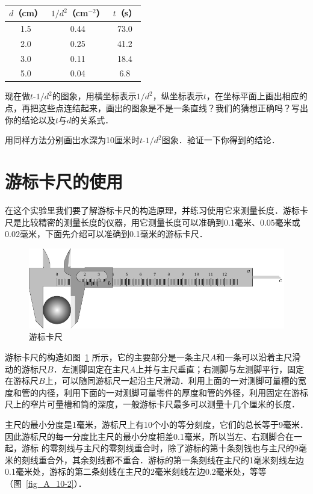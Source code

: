 \begin{table}[htbp]
	\centering
    \begin{tabular}{ccc}
        \toprule
		$d$（cm）  &  $1/d^2$（cm$^{-2}$） &  $t$（s）\\
		\midrule
		1.5 &  0.44 & 73.0 \\
		2.0 &  0.25 & 41.2 \\
		3.0 &  0.11 & 18.4 \\
		5.0 &  0.04 & 6.8\\
     	\bottomrule
    \end{tabular}
    \caption{}\label{tab_A_10-2}
\end{table}

现在做$t$-$1/d^2$的图象，用横坐标表示$1/d^2$，纵坐标表示$t$，在坐标平面上画出相应的点，再把这些点连结起来，画出的图象是不是一条直线？我们的猜想正确吗？写出你的结论以及$t$与$d$的关系式．

用同样方法分别画出水深为10厘米时$t$-$1/d^2$图象．验证一下你得到的结论．


\section{游标卡尺的使用}
在这个实验里我们要了解游标卡尺的构造原理，并练习使用它来测量长度．游标卡尺是比较精密的测量长度的仪器，用它测量长度可以准确到0.1毫米、0.05毫米或0.02毫米，下面先介绍可以准确到0.1毫米的游标卡尺．
\begin{figure}[htbp]
    \centering
    \includegraphics{fig/A/10-1.pdf}
    \caption{游标卡尺}\label{fig_A_10-1}
\end{figure}

游标卡尺的构造如图~\ref{fig_A_10-1} 所示，它的主要部分是一条主尺$A$和一条可以沿着主尺滑动的游标尺$B$．左测脚固定在主尺$A$上并与主尺垂直；右测脚与左测脚平行，固定在游标尺$B$上，可以随同游标尺一起沿主尺滑动．利用上面的一对测脚可量槽的宽度和管的内径，利用下面的一对测脚可量零件的厚度和管的外径，利用固定在游标尺上的窄片可量槽和筒的深度，一般游标卡尺最多可以测量十几个厘米的长度．

主尺的最小分度是1毫米，游标尺上有10个小的等分刻度，它们的总长等于9毫米．因此游标尺的每一分度比主尺的最小分度相差0.1毫米，所以当左、右测脚合在一起，游标
的零刻线与主尺的零刻线重合时，除了游标的第十条刻钱也与主尺的9毫米的刻线重合外，其余刻线都不重合．游标的第一条刻线在主尺的1毫米刻线左边0.1毫米处，游标的第二条刻线在主尺的2毫米刻线左边0.2毫米处，等等（图~\ref{fig_A_10-2}）．


